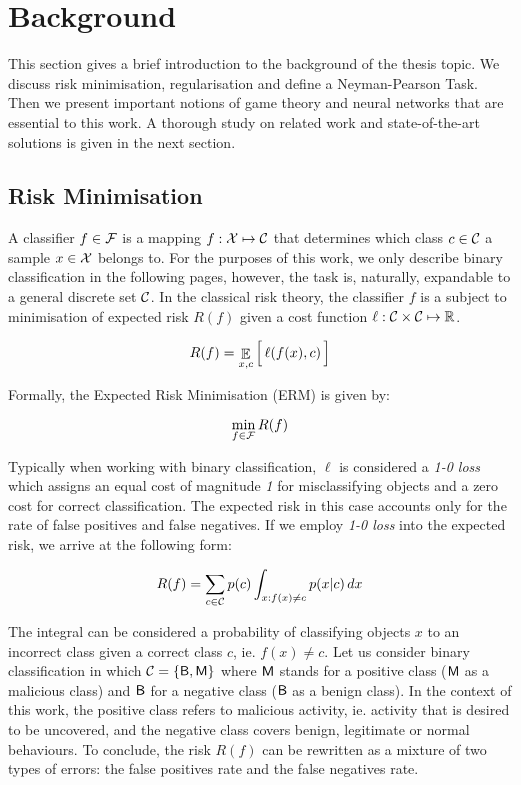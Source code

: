 \section{Background}\label{sec:background}
This section gives a brief introduction to the background of the thesis topic. We discuss risk minimisation, regularisation and define a Neyman-Pearson Task. Then we present important notions of game theory and neural networks that are essential to this work. A thorough study on related work and state-of-the-art solutions is given in the next section.

\subsection{Risk Minimisation}

A classifier $f \in \mathcal{F}$ is a mapping
$f: \mathcal{X} \mapsto \mathcal{C}$ that determines which class
$c \in \mathcal{C}$ a sample $x \in \mathcal{X}$ belongs to. For the
purposes of this work, we only describe binary classification in the
following pages, however, the task is, naturally, expandable to a
general discrete set $\mathcal{C}$. In the classical risk theory, the
classifier $f$ is a subject to minimisation of expected risk $R(f)$
given a cost function
$\ell: \mathcal{C} \times \mathcal{C} \mapsto \mathbb{R}$.

\begin{equation}\label{eq:empirical-risk-minimisation}
R(f) = \mathop{\mathbb{E}}_{x,c} \Big[\, \ell(f(x), c) \,\Big]
\end{equation}

Formally, the Expected Risk Minimisation (ERM) is given by:

\begin{equation}
\min_{f \in \mathcal{F}} R(f)
\end{equation}

Typically when working with binary classification, $\ell$ is considered
a \emph{1-0 loss} which assigns an equal cost of magnitude \emph{1} for
misclassifying objects and a zero cost for correct classification. The expected risk in this case accounts only for
the rate of false positives and false negatives. If we employ \emph{1-0
loss} into the expected risk, we arrive at the following form:

\begin{equation}
R(f) = \sum_{c \in \mathcal{C}} p(c) \int_{x: f(x) \neq c} p(x|c) \,  dx
\end{equation}

The integral can be considered a probability of classifying objects
$x$ to an incorrect class given a correct class $c$, ie.
$f(x) \neq c$. Let us consider binary classification in which
$\mathcal{C} = \{ \mathsf{B}, \mathsf{M} \}$ where $\mathsf{M}$
stands for a positive class ($\mathsf{M}$ as a malicious class) and $\mathsf{B}$
for a negative class ($\mathsf{B}$ as a benign class). In the context of this
work, the positive class refers to malicious activity, ie. activity that
is desired to be uncovered, and the negative class covers benign,
legitimate or normal behaviours. To conclude, the risk $R(f)$ can be
rewritten as a mixture of two types of errors: the false
positives rate and the false negatives rate.

